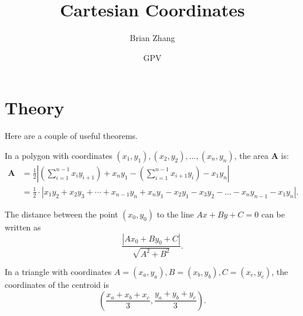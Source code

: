 \documentclass{article}
\title{Cartesian Coordinates}
\author{Brian Zhang}
\date{GPV}
\begin{document}
\maketitle
\section{Theory}

Here are a couple of useful theorems.

\begin{theo}[Shoelace]
In a polygon with coordinates $(x_1,y_1),(x_2,y_2),\dots,(x_n,y_n)$, the area $\mathbf{A}$ is:
\begin{align*}
    \mathbf{A} &= \frac{1}{2}\left|\left(\sum_{i=1}^{n-1}x_iy_{i+1}\right)+ x_ny_1-\left(\sum_{i=1}^{n-1}x_{i+1}y_i\right)-x_1y_n\right|\\ 
    &=\frac{1}{2}\cdot |x_1y_2+x_2y_3+\cdots + x_{n-1}y_n+x_ny_1-x_2y_1-x_3y_2-\dots-x_ny_{n-1}-x_1y_n|.
\end{align*}
\end{theo}

\begin{theo}
The distance between the point $(x_0,y_0)$ to the line $Ax+By+C=0$ can be written as 
\[\frac{|Ax_0+By_0+C|}{\sqrt{A^2+B^2}}.\]
\end{theo}

\begin{theo}
In a triangle with coordinates $A=(x_a,y_a),B=(x_b,y_b),C=(x_c,y_c)$, the coordinates of the centroid is
\[\left(\frac{x_a+x_b+x_c}{3},\frac{y_a+y_b+y_c}{3}\right).\]
\end{theo}
\end{document}

